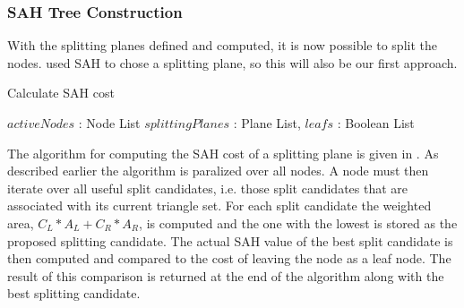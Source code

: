 \subsubsection{SAH Tree Construction}


With the splitting planes defined and computed, it is now possible to
split the nodes. \zhou used SAH to chose a splitting plane, so this
will also be our first approach. 

\begin{algorithm}
  \caption{Calculate SAH cost}
  \label{alg:calcSAHCost}
  \begin{algorithmic}
              {$activeNodes$ : Node List}
              {$splittingPlanes$ : Plane List, $leafs$ : Boolean List}{
                  \ENDFOR
                \ENDFOR
              }
  \end{algorithmic}
\end{algorithm}


The algorithm for computing the SAH cost of a splitting plane is given
in . As described earlier the algorithm is
paralized over all nodes. A node must then iterate over all useful
split candidates, i.e. those split candidates that are associated with
its current triangle set. For each split candidate the weighted area,
$C_L * A_L + C_R * A_R$, is computed and the one with the lowest is
stored as the proposed splitting candidate. The actual SAH value of
the best split candidate is then computed and compared to the cost of
leaving the node as a leaf node. The result of this comparison is
returned at the end of the algorithm along with the best splitting
candidate.

